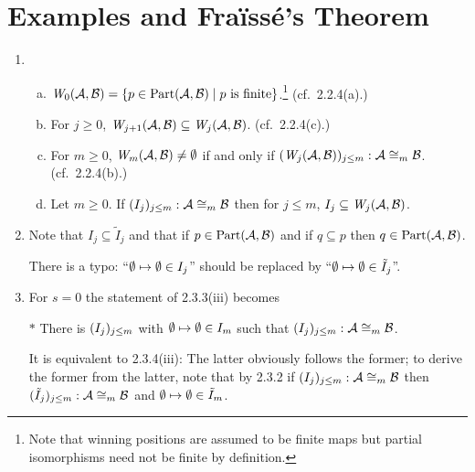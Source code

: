 \section{Examples and Fra\"{i}ss\'{e}'s Theorem}
\begin{enumerate}[1.]
%
\item {} \begin{enumerate}[(a)]
\item $\winpos{0}(\strct{A}, \strct{B}) = \sett{p \in \partisoms(\strct{A}, \strct{B})}{\mathmode{p} is finite}$.\footnote{Note that winning positions are assumed to be finite maps but partial isomorphisms need not be finite by definition.} (cf.\ 2.2.4(a).)
\item For $j \geq 0$, $\winpos{j + 1}(\strct{A}, \strct{B}) \subseteq \winpos{j}(\strct{A}, \strct{B})$. (cf.\ 2.2.4(c).)
\item For $m \geq 0$, $\winpos{m}(\strct{A}, \strct{B}) \neq \emptyset$ if and only if $\seq{\winpos{j}(\strct{A}, \strct{B})}{j \leq m}: \strct{A} \isom_m \strct{B}$. (cf.\ 2.2.4(b).)
\item Let $m \geq 0$. If $(I_j)_{j \leq m}: \mathcal{A} \cong_m \mathcal{B}$ then for $j \leq m$, $I_j \subseteq \winpos{j}(\strct{A}, \strct{B})$.
\end{enumerate}
%
\item {} Note that $I_j \subseteq \tilde{I}_j$ and that if $p \in \mathrm{Part}(\mathcal{A}, \mathcal{B})$ and if $q \subseteq p$ then $q \in \mathrm{Part}(\mathcal{A}, \mathcal{B})$.
\begin{remark}
There is a typo: ``$\emptyset \mapsto \emptyset \in I_j$'' should be replaced by ``$\emptyset \mapsto \emptyset \in \tilde{I}_j$''.
\end{remark}
%
\item {} For $s = 0$ the statement of 2.3.3(iii) becomes
\newpar
\begin{quoteno}{$\ast$}
There is $(I_j)_{j \leq m}$ with $\emptyset \mapsto \emptyset \in I_m$ such that $(I_j)_{j \leq m} : \mathcal{A} \cong_m \mathcal{B}$.
\end{quoteno}
\newpar
It is equivalent to 2.3.4(iii): The latter obviously follows the former; to derive the former from the latter, note that by 2.3.2 if $(I_j)_{j \leq m} : \mathcal{A} \cong_m \mathcal{B}$ then $(\tilde{I}_j)_{j \leq m} : \mathcal{A} \cong_m \mathcal{B}$ and $\emptyset \mapsto \emptyset \in \tilde{I}_m$.

\end{enumerate}
